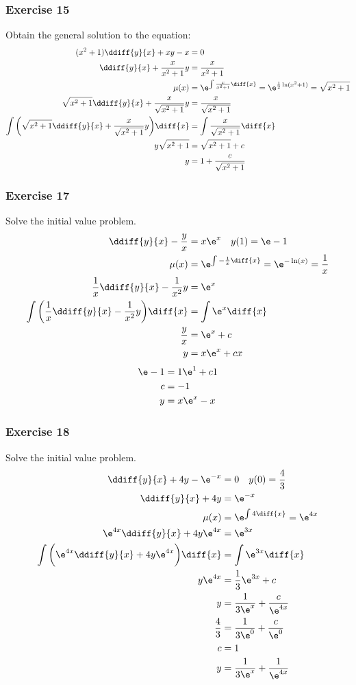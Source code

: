 \documentclass{math}
\begin{document}
\subsubsection*{Exercise 15}
Obtain the general solution to the equation:
\begin{align*}
  (x^2+1)\ddiff{y}{x}+xy-x &= 0 \\
  \ddiff{y}{x}+\frac{x}{x^2+1}y &= \frac{x}{x^2+1} \\
  \mu(x) &= \e^{\int\frac{x}{x^2+1}\diff{x}} = \e^{\frac{1}{2}\ln(x^2+1)} =
    \sqrt{x^2+1} \\
  \sqrt{x^2+1}\ddiff{y}{x}+\frac{x}{\sqrt{x^2+1}}y &= \frac{x}{\sqrt{x^2+1}} \\
  \int\bigg(\sqrt{x^2+1}\ddiff{y}{x}+\frac{x}{\sqrt{x^2+1}}y\bigg)\diff{x} &=
    \int\frac{x}{\sqrt{x^2+1}}\diff{x} \\
  y\sqrt{x^2+1} &= \sqrt{x^2+1}+c \\
  y &= 1+\frac{c}{\sqrt{x^2+1}}
\end{align*}

\subsubsection*{Exercise 17}
Solve the initial value problem.
\begin{align*}
  \ddiff{y}{x}-\frac{y}{x} &= x\e^x \quad y(1) = \e-1 \\
  \mu(x) &= \e^{\int-\frac{1}{x}\diff{x}} = \e^{-\ln(x)} = \frac{1}{x} \\
  \frac{1}{x}\ddiff{y}{x}-\frac{1}{x^2}y &= \e^x \\
  \int\bigg(\frac{1}{x}\ddiff{y}{x}-\frac{1}{x^2}y\bigg)\diff{x} &=
    \int\e^x\diff{x} \\
  \frac{y}{x} &= \e^x+c \\
  y &= x\e^x+cx
\end{align*}
\begin{align*}
  \e-1 &= 1\e^1+c1 \\
  c &= -1 \\
  y &= x\e^x-x
\end{align*}

\subsubsection*{Exercise 18}
Solve the initial value problem.
\begin{align*}
  \ddiff{y}{x}+4y-\e^{-x} &= 0 \quad y(0) = \frac{4}{3} \\
  \ddiff{y}{x}+4y &= \e^{-x} \\
  \mu(x) &= \e^{\int4\diff{x}} = \e^{4x} \\
  \e^{4x}\ddiff{y}{x}+4y\e^{4x} &= \e^{3x} \\
  \int\bigg(\e^{4x}\ddiff{y}{x}+4y\e^{4x}\bigg)\diff{x} &=
    \int\e^{3x}\diff{x} \\
  y\e^{4x} &= \frac{1}{3}\e^{3x}+c \\
  y &= \frac{1}{3\e^x}+\frac{c}{\e^{4x}} \\
  \frac{4}{3} &= \frac{1}{3\e^0}+\frac{c}{\e^0} \\
  c &= 1 \\
  y &= \frac{1}{3\e^x}+\frac{1}{\e^{4x}}
\end{align*}
\end{document}

